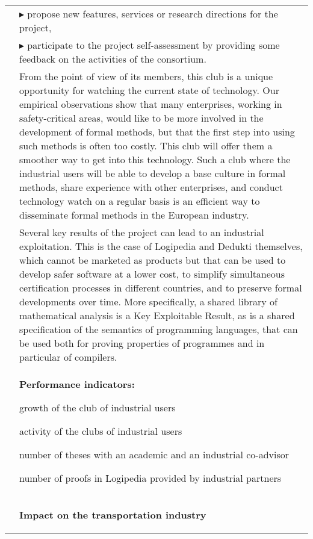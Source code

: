 \begin{longtable}{|p{}|p{}|}
&
$\blacktriangleright$ propose new features, services or research directions for the project,
\\
&
$\blacktriangleright$ participate to the project self-assessment by providing
some feedback on the activities of the consortium.\\
&
\hspace{0.4cm}
From the point of view of its members, this club is a unique
opportunity for watching the current state of technology. Our empirical observations show that
many enterprises, working in safety-critical areas, would like to be
more involved in the development of formal methods, but that the first
step into using such methods is often too costly. This club will offer
them a smoother way to get into this technology. Such a club
where the industrial users will be able to develop a base culture in
formal methods, share experience with other enterprises, and conduct
technology watch on a regular basis is an efficient way to disseminate
formal methods in the European industry.\\
&
\hspace{0.4cm}
Several key results of the project can lead to an industrial
exploitation. This is the case of Logipedia and Dedukti themselves,
which cannot be marketed as products but that can be used to develop safer
software at a lower cost, to simplify simultaneous certification
processes in different countries, and to preserve formal developments
over time. More specifically, a shared library of mathematical analysis is a Key
Exploitable Result, as is a shared specification of the semantics of
programming languages, that can be used both for proving properties of
programmes and in particular of compilers.\\
&\colorbox{color2}{\bf Performance indicators:}
\begin{compactitem}
  \item growth of the club of industrial users
  \item activity of the clubs of industrial users
  \item number of theses with an academic and an industrial co-advisor
  \item number of proofs in Logipedia provided by industrial partners
\end{compactitem}
\\
&
\definecolor{shadecolor}{named}{color1}
\begin{shaded}
{\bf\large Impact on the transportation industry}


\end{shaded}
\end{longtable}
